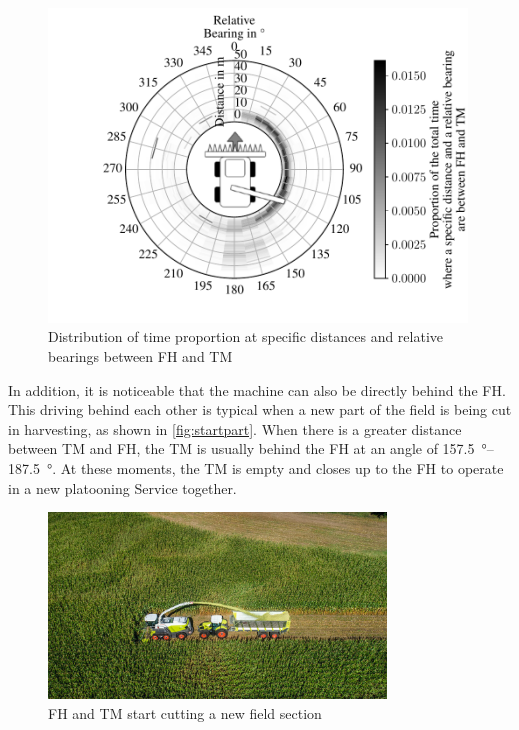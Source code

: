 \begin{figure}[H]
   \centering
   \includegraphics[width=0.99\textwidth]{figures/bearingHarvestScenario50.pdf}
   \caption{Distribution of time proportion at specific distances and relative bearings between \acf{FH} and \acf{TM}}%
   \label{fig:bearing}%
\end{figure}

In addition, it is noticeable that the machine can also be directly behind the \ac{FH}.
This driving behind each other is typical when a new part of the field is being cut in harvesting,
as shown in \autoref{fig:startpart}.
When there is a greater distance between \ac{TM} and \ac{FH}, the \ac{TM} is usually behind the FH at an angle of
\SIrange{157.5}{187.5}{\degree}.
At these moments, the \ac{TM} is empty and closes up to the \ac{FH} to operate in a new platooning Service together.

\begin{figure}[H]%
   \centering
   \includegraphics[width=0.8\textwidth]{figures/claas_harvest_behind.png}
   \caption{\acf{FH} and \acf{TM} start cutting a new field section}%
   \label{fig:startpart}%
\end{figure}

